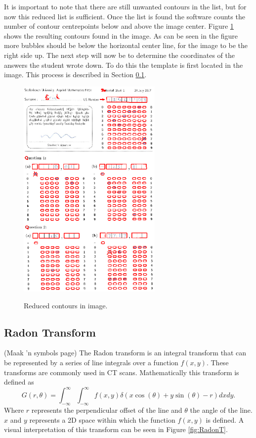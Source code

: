 It is important to note that there are still unwanted contours in the list, but for now this reduced list is sufficient. Once the list is found the software counts the number of contour centrepoints below and above the image center. Figure \ref{fig:reduced} shows the resulting contours found in the image. As can be seen in the figure more bubbles should be below the horizontal center line, for the image to be the right side up. The next step will now be to determine the coordinates of the answers the student wrote down. To do this the template is first located in the image. This process is described in Section \ref{sec:RadonTransform}.

\begin{figure}
  \centering
  \includegraphics[width=7cm]{Reduced}\\
  \caption{Reduced contours in image.}
  \label{fig:reduced}
\end{figure}

\subsection{Radon Transform}
\label{sec:RadonTransform}
(Maak 'n symbols page)
The Radon transform is an integral transform that can be represented by a series of line integrals over a function $f(x,y)$. These transforms are commonly used in CT scans. Mathematically this transform is defined as $$G(r,\theta) = \int_{-\infty}^{\infty} \int_{-\infty}^{\infty} f(x, y) \delta(x\cos(\theta) + y\sin(\theta) - r) dx dy.$$Where $r$ represents the perpendicular offset of the line and $\theta$ the angle of the line. $x$ and $y$ represents a 2D space within which the function $f(x,y)$ is defined.  A visual interpretation of this transform can be seen in Figure \ref{fig:RadonT}.  

